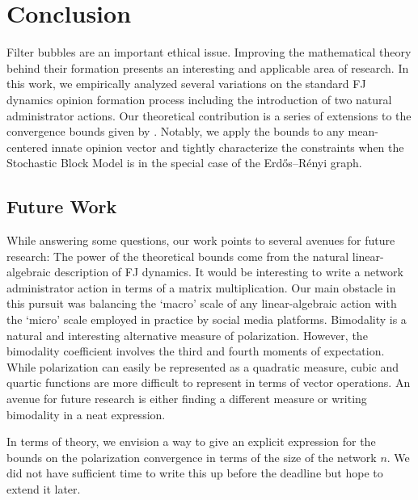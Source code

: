 
\section{Conclusion}\label{sec:conclusion}
Filter bubbles are an important ethical issue.
Improving the mathematical theory behind their formation
presents an interesting and applicable area of research.
In this work, we empirically analyzed several
variations on the standard FJ dynamics opinion formation process
including the introduction of two natural
administrator actions.
Our theoretical contribution is a series of extensions
to the convergence bounds given by \cite{chitra20analyzing}.
Notably, we apply the bounds to any mean-centered
innate opinion vector and tightly characterize the
constraints when the Stochastic Block Model is in
the special case of the Erdős–Rényi graph.

\subsection{Future Work}

While answering some questions, our work points to several
avenues for future research:
The power of the theoretical bounds come from the natural
linear-algebraic description of FJ dynamics.
It would be interesting to write a network
administrator action in terms of a matrix multiplication.
Our main obstacle in this pursuit was balancing the
`macro' scale of any linear-algebraic action with
the `micro' scale employed in practice by social media platforms.
Bimodality is a natural and interesting alternative
measure of polarization.
However, the bimodality coefficient involves the third and fourth moments
of expectation.
While polarization can easily be represented as a quadratic measure,
cubic and quartic functions are more difficult to represent
in terms of vector operations.
An avenue for future research is either finding a
different measure or writing bimodality in a neat expression.

In terms of theory, we envision a way to give an explicit
expression for the bounds on the polarization convergence
in terms of the size of the network $n$.
We did not have sufficient time to write this up before
the deadline but hope to extend it later.

